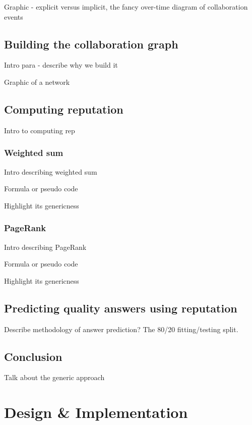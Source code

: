 \documentclass[]{final_report}
\begin{document}
Graphic - explicit versus implicit, the fancy over-time diagram of collaboration events

\section{Building the collaboration graph}

Intro para - describe why we build it

Graphic of a network

\section{Computing reputation}

Intro to computing rep

\subsection{Weighted sum}

Intro describing weighted sum

Formula or pseudo code

Highlight its genericness

\subsection{PageRank}

Intro describing PageRank

Formula or pseudo code

Highlight its genericness

\section{Predicting quality answers using reputation}

Describe methodology of answer prediction? The 80/20 fitting/testing split.

\section{Conclusion}

Talk about the generic approach

\chapter{Design \& Implementation}

\end{document}
